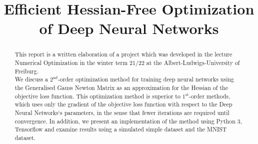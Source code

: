 \documentclass[conference]{IEEEtran}
\begin{document}
\title{Efficient Hessian-Free Optimization of Deep Neural Networks
}

\author{
\and
{}
\and
{}
}

\maketitle
\thispagestyle{plain}
\pagestyle{plain}

\begin{abstract}
This report is a written elaboration of a project which was developed in the lecture Numerical Optimization in the winter term 21/22 at the Albert-Ludwigs-University of Freiburg.\\
We discuss a $2^{\text{nd}}$-order optimization method for training deep neural networks using the Generalised Gauss Newton Matrix as an approximation for the Hessian of the objective loss function. This optimization method is superior to $1^{\text{st}}$-order methods, which uses only the gradient of the objective loss function with respect to the Deep Neural Networks`s parameters, in the sense that fewer iterations are required until convergence. In addition, we present an implementation of the method using Python 3, Tensorflow and examine results using a simulated simple dataset and the MNIST dataset.
\end{abstract}
\end{document}
